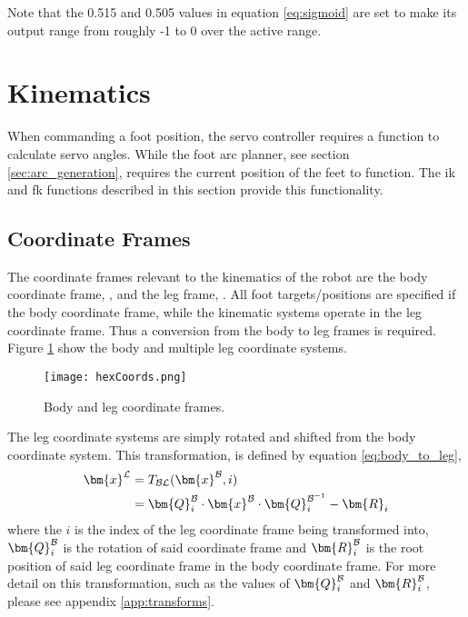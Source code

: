             \noindent
            Note that the 0.515 and 0.505 values in equation \ref{eq:sigmoid} are set to make its output range from roughly -1 to 0 over the active range.

\newpage
\section{Kinematics}
    When commanding a foot position, the servo controller requires a function to calculate servo angles. While the foot arc planner, see section 
    \ref{sec:arc_generation}, requires the current position of the feet to function. The \ac{ik} and \ac{fk} functions described in this section provide
    this functionality. 
    
    \subsection{Coordinate Frames}
        The coordinate frames relevant to the kinematics of the robot are the body coordinate frame, \fbody, and the leg frame, \fleg. All foot targets/positions are specified
        if the body coordinate frame, while the kinematic systems operate in the leg coordinate frame. Thus a conversion from the body to leg frames is required. 
        Figure \ref{fig:coords_top} show the body and multiple leg coordinate systems.
        \begin{figure}[h]
            \centering
            \texttt{[image: hexCoords.png]}
            \caption{Body and leg coordinate frames.}
            \label{fig:coords_top}
        \end{figure}
        The leg coordinate systems are simply rotated and shifted from the body coordinate system. This transformation, is defined by equation \ref{eq:body_to_leg},
        \begin{equation}\label{eq:body_to_leg}
        \begin{split}
            \bm{x}^\fleg &= \transframenew{\bm{x}^\fbody, i}{\fbody}{\fleg} \\
            & = \bm{Q}_i^\fbody\cdot\bm{x}^\fbody\cdot\bm{Q}^{\fbody^{-1}}_{i} - \bm{R}_i
        \end{split}
        \end{equation}
        where the  \(i\) is the index of the leg coordinate frame being transformed into, \(\bm{Q}_i^\fbody\) is the rotation of said coordinate frame and \(\bm{R}^\fbody_i\) is the root position of
        said leg coordinate frame in the body coordinate frame. For more detail on this transformation, such as the values of \(\bm{Q}_i^\fbody\) and \(\bm{R}^\fbody_i\), please see
        appendix \ref{app:transforms}.

